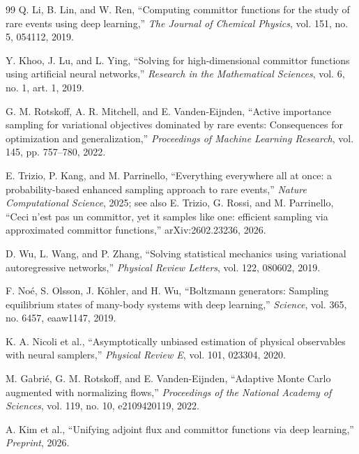 \documentclass[11pt]{article}
\begin{document}
\begin{thebibliography}{99}
		Q. Li, B. Lin, and W. Ren, ``Computing committor functions for the study of rare events using deep learning,'' \emph{The Journal of Chemical Physics}, vol. 151, no. 5, 054112, 2019.
		
		Y. Khoo, J. Lu, and L. Ying, ``Solving for high-dimensional committor functions using artificial neural networks,'' \emph{Research in the Mathematical Sciences}, vol. 6, no. 1, art. 1, 2019.
		
		G. M. Rotskoff, A. R. Mitchell, and E. Vanden-Eijnden, ``Active importance sampling for variational objectives dominated by rare events: Consequences for optimization and generalization,'' \emph{Proceedings of Machine Learning Research}, vol. 145, pp. 757--780, 2022.

		E. Trizio, P. Kang, and M. Parrinello, ``Everything everywhere all at once: a probability-based enhanced sampling approach to rare events,'' \emph{Nature Computational Science}, 2025; see also E. Trizio, G. Rossi, and M. Parrinello, ``Ceci n'est pas un committor, yet it samples like one: efficient sampling via approximated committor functions,'' arXiv:2602.23236, 2026.

		D. Wu, L. Wang, and P. Zhang, ``Solving statistical mechanics using variational autoregressive networks,'' \emph{Physical Review Letters}, vol. 122, 080602, 2019.
		
		F. No\'{e}, S. Olsson, J. K\"{o}hler, and H. Wu, ``Boltzmann generators: Sampling equilibrium states of many-body systems with deep learning,'' \emph{Science}, vol. 365, no. 6457, eaaw1147, 2019.
		
		K. A. Nicoli et al., ``Asymptotically unbiased estimation of physical observables with neural samplers,'' \emph{Physical Review E}, vol. 101, 023304, 2020.
		
		M. Gabri\'{e}, G. M. Rotskoff, and E. Vanden-Eijnden, ``Adaptive Monte Carlo augmented with normalizing flows,'' \emph{Proceedings of the National Academy of Sciences}, vol. 119, no. 10, e2109420119, 2022.
		
		A. Kim et al., ``Unifying adjoint flux and committor functions via deep learning,'' \emph{Preprint}, 2026.
		
	\end{thebibliography}
	
\end{document}
